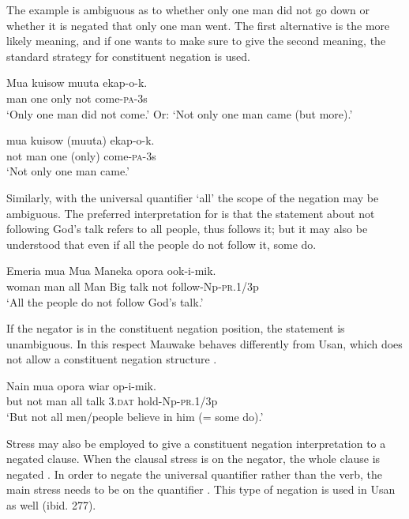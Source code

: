 The example  is ambiguous as to whether only one man did not go down or whether it is negated that only one man went. The first alternative is the more likely meaning, and if one wants to make sure to give the second meaning, the standard strategy for constituent negation  is used.

\ea%
\label{ex:x1145}
\gll Mua  kuisow  muuta    ekap-o-k. \\
man  one  only  not  come-\textsc{pa}-3s\\
\glt `Only one man did not come.' Or: `Not only one man came (but more).'
\z

\ea%
\label{ex:x1144}
\gll {}  mua  kuisow  (muuta)  ekap-o-k. \\
not  man  one  (only)  come-\textsc{pa}-3s\\
\glt `Not only one man came.'
\z

Similarly, with the universal quantifier  `all' the scope of the negation may be ambiguous. The preferred interpretation for  is that the statement about not following God's talk refers to all people, thus  follows it; but it may also be understood that even if all the people do not follow it, some do.

\ea%
\label{ex:x1148}
\gll Emeria  mua    Mua  Maneka  opora    ook-i-mik. \\
woman  man  all  Man  Big  talk  not  follow-Np-\textsc{pr}.1/3p\\
\glt `All the people do not follow God's talk.'
\z

If the negator is in the constituent negation position, the statement is unambiguous. In this respect Mauwake behaves differently from Usan, which does not allow a constituent negation structure \citep[275--277]{Reesink1987}.

\ea%
\label{ex:x1149}
\gll Nain    mua    opora  wiar  op-i-mik. \\
but  not  man  all  talk  3.\textsc{dat}  hold-Np-\textsc{pr}.1/3p\\
\glt `But not all men/people believe in him (= some do).'
\z

Stress may also be employed to give a constituent negation interpretation to a negated clause. When the clausal stress is on the negator, the whole clause is negated . In order to negate the universal quantifier rather than the verb, the main stress needs to be on the quantifier . This type of negation is used in Usan as well (ibid. 277).

